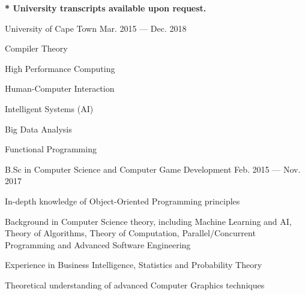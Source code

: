 
\textbf{* University transcripts available upon request.}

\begin{cventries}

  {University of Cape Town}
  {Mar. 2015 --- Dec. 2018}
  {}
  {
    \begin{cvitems}
      \item {Compiler Theory}
      \item {High Performance Computing}
      \item {Human-Computer Interaction}
      \item {Intelligent Systems (AI)}
      \item {Big Data Analysis}
      \item {Functional Programming}
    \end{cvitems}
  }

  {B.Sc in Computer Science and Computer Game Development}
  {Feb. 2015 --- Nov. 2017}
  {}
  {
    \begin{cvitems}
      \item {In-depth knowledge of Object-Oriented Programming principles}
      \item {Background in Computer Science theory, including Machine Learning and AI, Theory of Algorithms, Theory of Computation, Parallel/Concurrent Programming and Advanced Software Engineering}
      \item {Experience in Business Intelligence, Statistics and Probability Theory}
      \item {Theoretical understanding of advanced Computer Graphics techniques}
    \end{cvitems}
  }

\end{cventries}
